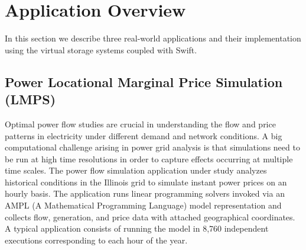 \documentclass{sig-alternate}
\begin{document}
\section{Application Overview}\label{sec:app}
In this section we describe three real-world applications and their
implementation using the virtual storage systems coupled with Swift. 

\subsection{Power Locational Marginal Price Simulation (LMPS)}
Optimal power flow studies are crucial in understanding the flow and price
patterns in electricity under different demand and network conditions. A big
computational challenge arising in power grid analysis is that simulations need
to be run at high time resolutions in order to capture effects occurring at
multiple time scales. The power flow simulation application under study
analyzes historical conditions in the Illinois grid to simulate instant power
prices on an hourly basis. The application runs linear programming solvers
invoked via an AMPL (A Mathematical Programming Language) model
representation and collects flow, generation, and price data with attached
geographical coordinates. A typical application consists of running the model
in 8,760 independent executions corresponding to each hour of the year.
%
%
\end{document}
